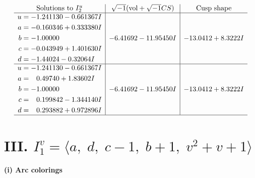 \documentclass[1p]{elsarticle_modified}
\theoremstyle{definition}
\newcommand{\I}{\sqrt{-1}}
\begin{document}
$$\begin{array}{c|c|c}
\text{Solutions to }I^u_{2}& \I (\text{vol} + \sqrt{-1}CS) & \text{Cusp shape}\\
 \hline 
\begin{aligned}
u &= -1.241130 - 0.661367 I \\
a &= -0.160346 + 0.333380 I \\
b &= -1.00000\phantom{ +0.000000I} \\
c &= -0.043949 + 1.401630 I \\
d &= -1.44024 - 0.32064 I\end{aligned}
 & -6.41692 - 11.95450 I & -13.0412 + 8.3222 I \\ \hline\begin{aligned}
u &= -1.241130 - 0.661367 I \\
a &= \phantom{-}0.49740 + 1.83602 I \\
b &= -1.00000\phantom{ +0.000000I} \\
c &= \phantom{-}0.199842 - 1.344140 I \\
d &= \phantom{-}0.293882 + 0.972896 I\end{aligned}
 & -6.41692 - 11.95450 I & -13.0412 + 8.3222 I\\
 \hline 
 \end{array}$$\newpage\newpage\renewcommand{\arraystretch}{1}
\centering \section*{III. $I^v_{1}= \langle a,\;d,\;c-1,\;b+1,\;v^2+v+1 \rangle$}
\flushleft \textbf{(i) Arc colorings}\\
\end{document}
